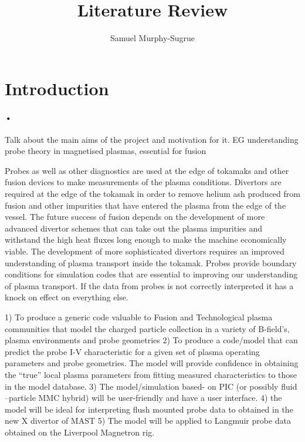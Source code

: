 \documentclass[12pt]{article}
\begin{document}


\title{Literature Review}
\author{Samuel Murphy-Sugrue\\}

\maketitle
\clearpage
\tableofcontents
\clearpage


\section{Introduction}
\paragraph{•}
Talk about the main aims of the project and motivation for it. EG understanding probe theory in magnetised plasmas, essential for fusion

Probes as well as other diagnostics are used at the edge of tokamaks and other fusion devices to make measurements of the plasma conditions. Divertors are required at the edge of the tokamak in order to remove helium ash produced from fusion and other impurities that have entered the plasma from the edge of the vessel. The future success of fusion depends on the development of more advanced divertor schemes that can take out the plasma impurities and withstand the high heat fluxes long enough to make the machine economically viable. The development of more sophisticated divertors requires an improved understanding of plasma transport inside the tokamak. Probes provide boundary conditions for simulation codes that are essential to improving our understanding of plasma transport. If the data from probes is not correctly interpreted it has a knock on effect on everything else. 


1)  To produce a generic code valuable to Fusion and Technological plasma communities that model the charged particle collection in a variety of B-field’s, plasma environments and probe geometries
2) To produce a code/model that can predict the probe I-V characteristic for a given set of plasma operating parameters and probe geometries. The model will provide confidence in obtaining the “true”  local plasma parameters from  fitting measured characteristics to those in the model database.
3) The model/simulation based- on PIC  (or possibly fluid –particle MMC hybrid) will be user-friendly and have a user interface. 
4) the model will be ideal for interpreting flush mounted probe data to obtained in the new X divertor of MAST
5) The model will be applied to Langmuir probe data obtained on the Liverpool Magnetron rig. 
\end{document}
